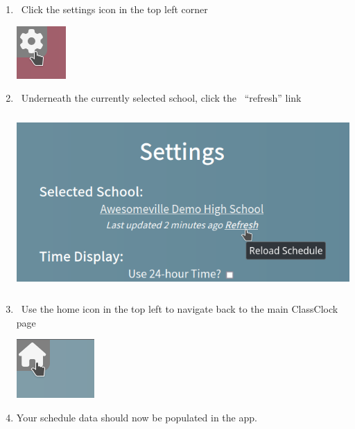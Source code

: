 \documentclass{article}
\begin{document}
\begin{enumerate}
\begin{center}
\end{center}
\item {\ Click the settings icon in the top left corner}
\begin{center}
\includegraphics[width=0.7398in,height=0.7917in]{Mini20Manual-img014.png}
\end{center}
\item {\ Underneath the currently selected school, click the \ “refresh” link }
\begin{center}
\includegraphics[width=5.511in,height=2.6335in]{Mini20Manual-img015.png}
\end{center}
\item {\ Use the home icon in the top left to navigate back to the main ClassClock page}
\begin{center}
\includegraphics[width=1.1661in,height=0.8846in]{Mini20Manual-img016.png}
\end{center}
\item {Your schedule data should now be populated in the app.}
\begin{center}

\end{center}
\end{enumerate}
\end{document}
